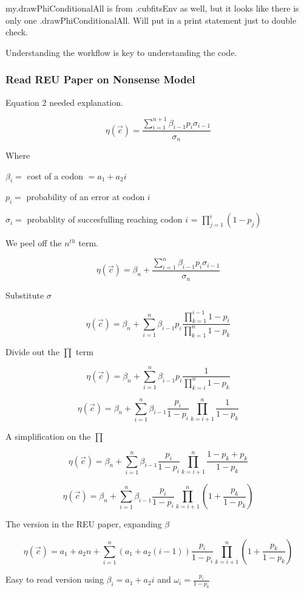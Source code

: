 my.drawPhiConditionalAll is from .cubfitsEnv as well, but it looks like there is only one .drawPhiConditionalAll. Will put in a print statement just to double check.

Understanding the workflow is key to understanding the code.


\subsubsection{Read REU Paper on Nonsense Model}
Equation 2 needed explanation.

$$\eta(\vec{c}) =
\frac{\sum_{i=1}^{n+1}\beta_{i-1} p_i \sigma_{i-1}}
{\sigma_n}$$

\noindent Where

$\beta_i = $ cost of a codon $ = a_1 + a_2i$

$p_i = $ probability of an error at codon $i$

$\sigma_i = $ probablity of succesfulling reaching codon $i$ = $\prod_{j=1}^{i}(1-p_j)$

We peel off the $n^{th}$ term.

$$\eta(\vec{c}) =
\beta_n + 
\frac{\sum_{i=1}^{n}
\beta_{i-1}
p_i
\sigma_{i-1}}
{\sigma_n}
$$



Substitute $\sigma$

$$\eta(\vec{c}) =
\beta_{n} +
\sum_{i=1}^{n}
\beta_{i-1}
p_i
\frac{\prod_{k=1}^{i-1}1-p_i}
{\prod_{k=1}^{n}1-p_k}
$$


Divide out the $\prod$ term

$$\eta(\vec{c}) =
\beta_{n} +
\sum_{i=1}^{n}
\beta_{i-1}
p_i
\frac{1}
{\prod_{k=i}^{n}1-p_k}
$$



$$\eta(\vec{c}) =
\beta_{n} +
\sum_{i=1}^{n}
\beta_{i-1}
\frac{p_i}{1-p_i}
\prod_{k=i+1}^{n}\frac{1}
{1-p_k}
$$

A simplification on the $\prod$

$$\eta(\vec{c}) =
\beta_{n} +
\sum_{i=1}^{n}
\beta_{i-1}
\frac{p_i}{1-p_i}
\prod_{k=i+1}^{n}\frac{1-p_k + p_k}
{1-p_k}
$$


$$\eta(\vec{c}) =
\beta_{n} +
\sum_{i=1}^{n}
\beta_{i-1}
\frac{p_i}{1-p_i}
\prod_{k=i+1}^{n}(1 + \frac{p_k}
{1-p_k})
$$

The version in the REU paper, expanding $\beta$

$$\eta(\vec{c}) =
a_1 + a_2n + 
\sum_{i=1}^{n}
(a_1 + a_2(i-1))
\frac{p_i}{1-p_i}
\prod_{k=i+1}^{n}(1 + \frac{p_k}
{1-p_k})
$$

Easy to read version using $\beta_i = a_1 + a_2i$ and $\omega_i = \frac{p_i}{1-p_k}$

